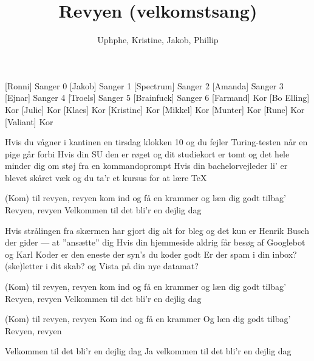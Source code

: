 \documentclass[a4paper,11pt]{article}
\title{Revyen (velkomstsang)}
\author{Uphphe, Kristine, Jakob, Phillip}
\begin{document}
\maketitle

\begin{roles}
[Ronni]  Sanger 0
[Jakob]  Sanger 1
[Spectrum]  Sanger 2
[Amanda]  Sanger 3
[Ejnar]  Sanger 4
[Troels]  Sanger 5
[Brainfuck]  Sanger 6
[Farmand]  Kor
[Bo Elling]  Kor
[Julie]  Kor
[Klaes]  Kor
[Kristine]  Kor
[Mikkel]  Kor
[Munter]  Kor
[Rune]  Kor
[Valiant]  Kor
\end{roles}

\begin{props}
\end{props}

\begin{song}

Hvis du vågner i kantinen
en tirsdag klokken 10
og du fejler Turing-testen
når en pige går forbi
Hvis din SU den er røget
og dit studiekort er tomt
og det hele minder dig om støj
fra en kommandoprompt
Hvis din bachelorvejleder
li' er blevet skåret væk
og du ta'r et kursus for at lære TeX

(Kom) til revyen, revyen
kom ind og få en krammer
og læn dig godt tilbag'
Revyen, revyen
Velkommen til
det bli'r en dejlig dag

Hvis strålingen fra skærmen
har gjort dig alt for bleg
og det kun er Henrik Busch
der gider --- at ''ansætte'' dig 
Hvis din hjemmeside aldrig
får besøg af Googlebot
og Karl Koder er den eneste
der syn's du koder godt
Er der spam i din inbox?
(ske)letter i dit skab?
og Vista på din nye datamat?

(Kom) til revyen, revyen
kom ind og få en krammer
og læn dig godt tilbag'
Revyen, revyen
Velkommen til
det bli'r en dejlig dag



(Kom) til revyen, revyen
Kom ind og få en krammer
Og læn dig godt tilbag'
Revyen, revyen

Velkommen til
det bli'r en dejlig dag
Ja velkommen til
det bli'r en dejlig dag

\end{song}
\end{document}
